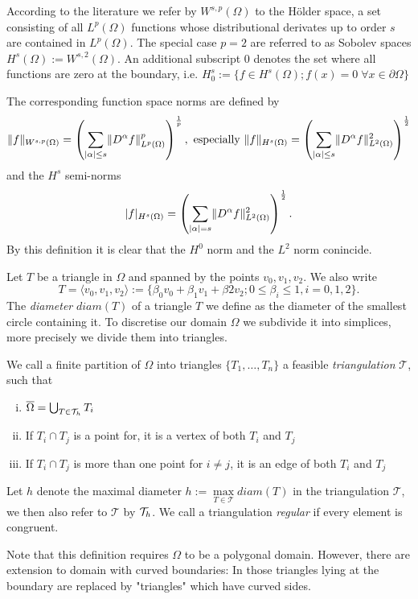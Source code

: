 \begin{definition} \label{def: function spaces and norms}
According to the literature we refer by $W^{s,p}(\Omega)$ to the H\"older space, a set consisting of all $L^p(\Omega)$ functions whose distributional derivates up to order $s$ are contained in $L^ p(\Omega)$.
 The special case $p=2$ are referred to as Sobolev spaces $H^s(\Omega):=W^{s,2}(\Omega)$. An additional subscript $0$ denotes the set where all functions are zero at the boundary, i.e. $H^s_0 :=\{f \in H^s(\Omega); f(x)=0 \; \forall x \in \partial \Omega\}$

The corresponding function space norms are defined by
\[
	\lVert f \rVert _{W^{s,p}(\Omega)} = \left( \sum_{|\alpha| \leq s} \lVert D^\alpha f \rVert^p_{L^p(\Omega)}\right)^{\frac 1 p }, \text{   especially } \lVert f \rVert _{H^{s}(\Omega)}=\left( \sum_{|\alpha| \leq s} \lVert D^\alpha f \rVert^2_{L^2(\Omega)}\right)^{\frac 1 2 }
\]
and the $H^s$ semi-norms
\[ 
 	|f|_{H^{s}(\Omega)}=\left( \sum_{|\alpha| = s} \lVert D^\alpha f \rVert^2_{L^2(\Omega)}\right)^{\frac 1 2 }.
\]
By this definition it is clear that the $H^0$ norm and the $L^2$ norm conincide.

Let $T$ be a triangle in $\Omega$ and spanned by the points $v_0, v_1, v_2$. We also write 
\[
	T= \langle v_0, v_1, v_2 \rangle := \{\beta_0 v_0+ \beta_1 v_1 +\beta2 v_2; 0 \leq \beta_i \leq 1, i= 0,1,2\}.
\]
The \emph{diameter} $diam(T)$ of a triangle $T$ we define as the diameter of the smallest circle containing it.
To discretise our domain $\Omega$ we subdivide it into simplices, more precisely we divide them into triangles.
\begin{definition}
	We call a finite partition of $\Omega$ into triangles $\{T_1, \dots, T_n\}$ a feasible \emph{triangulation} $\mathcal{T}$, such that
	\begin{enumerate}[(i)]
		\item	$\overline \Omega = \bigcup_{T \in \mathcal{T}_h} T_i$
		\item If $T_i \cap T_j$ is a point for, it is a vertex of both $T_i$ and $T_j$
		\item If $T_i \cap T_j$ is more than one point for $i \neq j$, it is an edge of both $T_i$ and $T_j$
	\end{enumerate}
	Let $h$ denote the maximal diameter $h:= \operatorname{max}\limits_{T\in \mathcal T} diam(T)$ in the triangulation $\mathcal T$, we then also refer to $\mathcal{T}$ by $\mathcal{T}_h$. We call a triangulation \emph{regular} if every element is congruent.
\end{definition}
Note that this definition requires $\Omega$ to be a polygonal domain. However, there are extension to domain with curved boundaries: In those triangles lying at the boundary are replaced by "triangles" which have curved sides. 


\end{definition}
